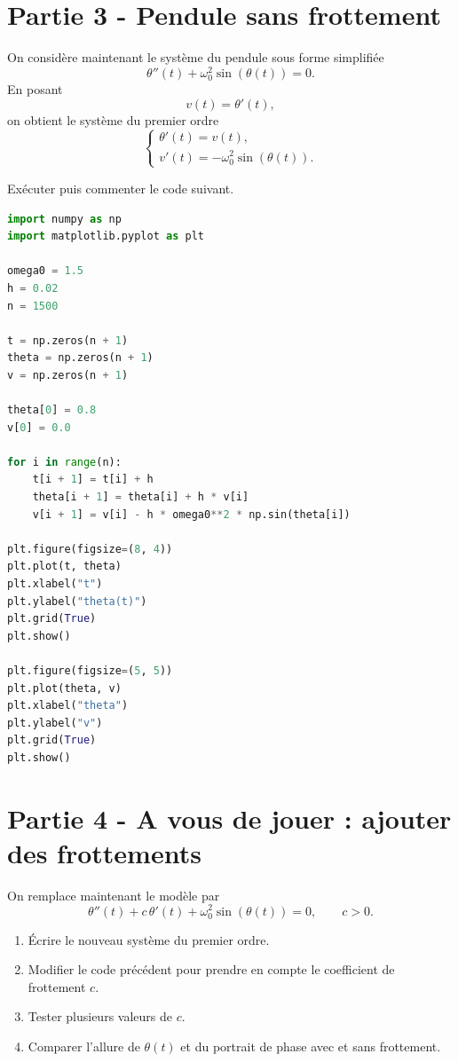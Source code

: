\section*{Partie 3 - Pendule sans frottement}
On considère maintenant le système du pendule sous forme simplifiée
\[
\theta''(t)+\omega_0^2\sin(\theta(t))=0.
\]
En posant
\[
v(t)=\theta'(t),
\]
on obtient le système du premier ordre
\[
\begin{cases}
\theta'(t)=v(t),\\
v'(t)=-\omega_0^2\sin(\theta(t)).
\end{cases}
\]

\noindent Exécuter puis commenter le code suivant.

\begin{lstlisting}[language=Python]
import numpy as np
import matplotlib.pyplot as plt

omega0 = 1.5
h = 0.02
n = 1500

t = np.zeros(n + 1)
theta = np.zeros(n + 1)
v = np.zeros(n + 1)

theta[0] = 0.8
v[0] = 0.0

for i in range(n):
    t[i + 1] = t[i] + h
    theta[i + 1] = theta[i] + h * v[i]
    v[i + 1] = v[i] - h * omega0**2 * np.sin(theta[i])

plt.figure(figsize=(8, 4))
plt.plot(t, theta)
plt.xlabel("t")
plt.ylabel("theta(t)")
plt.grid(True)
plt.show()

plt.figure(figsize=(5, 5))
plt.plot(theta, v)
plt.xlabel("theta")
plt.ylabel("v")
plt.grid(True)
plt.show()
\end{lstlisting}

\section*{Partie 4 - A vous de jouer : ajouter des frottements}
On remplace maintenant le modèle par
\[
\theta''(t)+c\,\theta'(t)+\omega_0^2\sin(\theta(t))=0,
\qquad c>0.
\]

\begin{enumerate}
    \item Écrire le nouveau système du premier ordre.

    \item Modifier le code précédent pour prendre en compte le coefficient de frottement $c$.

    \item Tester plusieurs valeurs de $c$.

    \item Comparer l'allure de $\theta(t)$ et du portrait de phase avec et sans frottement.
\end{enumerate}

